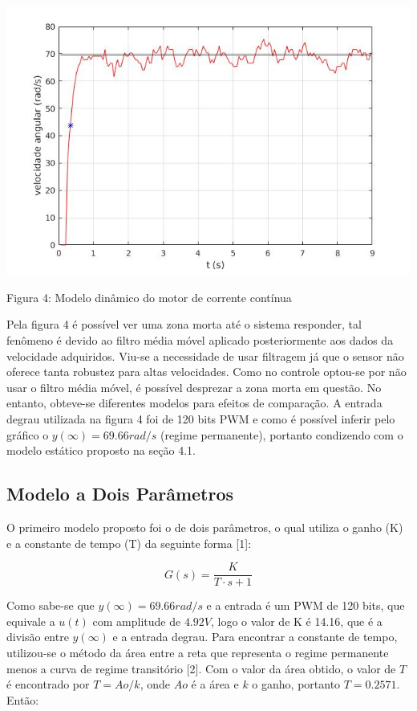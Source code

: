 \documentclass{article}
\begin{document}
\begin{center}
\centering
  \includegraphics[scale=0.5]{imagens/untitled2.jpg}
  
  \caption{Figura 4: Modelo dinâmico do motor de corrente contínua}
\end{center}

Pela figura 4 é possível ver uma zona morta até o sistema responder, tal fenômeno é devido ao filtro média móvel aplicado posteriormente aos dados da velocidade adquiridos. Viu-se a necessidade de usar filtragem já que o sensor não oferece tanta robustez para altas velocidades. Como no controle optou-se por não usar o filtro média móvel, é possível desprezar a zona morta em questão. No entanto, obteve-se diferentes modelos para efeitos de comparação. A entrada degrau utilizada na figura 4 foi de 120 bits PWM e como é possível inferir pelo gráfico o $y({\infty}) = 69.66 rad/s$  (regime permanente), portanto condizendo com o modelo estático proposto na seção 4.1.

\subsection{Modelo a Dois Parâmetros}
O primeiro modelo proposto foi o de dois parâmetros, o qual utiliza o ganho (K) e a constante de tempo (T) da seguinte forma [1]:

\begin{equation}
    G(s) = \frac{K}{T \cdot s + 1}
\end{equation}

Como sabe-se que $y({\infty}) = 69.66 rad/s$ e a entrada é um PWM de 120 bits, que equivale a $u(t)$ com amplitude de $4.92V$, logo o valor de K é 14.16, que é a divisão entre $y({\infty})$ e a entrada degrau. Para encontrar a constante de tempo, utilizou-se o método da área entre a reta que representa o regime permanente menos a curva de regime transitório [2]. Com o valor da área obtido, o valor de $T$ é encontrado por $T=Ao/k$, onde $Ao$ é a área e $k$ o ganho, portanto $T = 0.2571$. Então:
\end{document}
